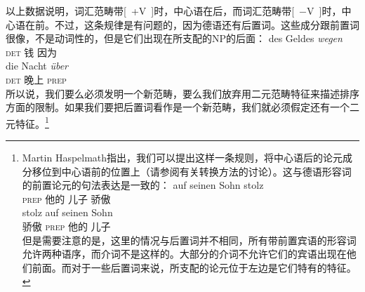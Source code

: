 \zl
以上数据说明，词汇范畴带[~+V~]时，中心语在后，而词汇范畴带[~$-$V~]时，中心语在前。不过，这条规律是有问题的，因为德语还有后置词。这些成分跟前置词很像，不是动词性的，但是它们出现在所支配的NP的后面：
\eal
\ex 
\gll des Geldes \emph{wegen}\\
     \textsc{det} 钱 因为\\
\ex 
\gll die Nacht \emph{über}\\
     \textsc{det} 晚上 \textsc{prep}\\
\zl
所以说，我们要么必须发明一个新范畴，要么我们放弃用二元范畴特征来描述排序方面的限制。如果我们要把后置词看作是一个新范畴，我们就必须假定还有一个二元特征。\footnote{%
Martin Haspelmath指出，我们可以提出这样一条规则，将中心语后的论元成分移位到中心语前的位置上（请参阅\citealp[]{Riemsdijk78a}有关转换方法的讨论）。这与德语形容词的前置论元的句法表达是一致的：
\eal
\ex
\gll auf seinen Sohn stolz\\
     \textsc{prep}  他的 儿子 骄傲\\
\ex 
\gll stolz auf seinen Sohn\\
     骄傲 \textsc{prep} 他的 儿子\\
\zl
但是需要注意的是，这里的情况与后置词并不相同，所有带前置宾语的形容词允许两种语序，而介词不是这样的。大部分的介词不允许它们的宾语出现在他们前面。而对于一些后置词来说，所支配的论元位于左边是它们特有的特征。
} 
